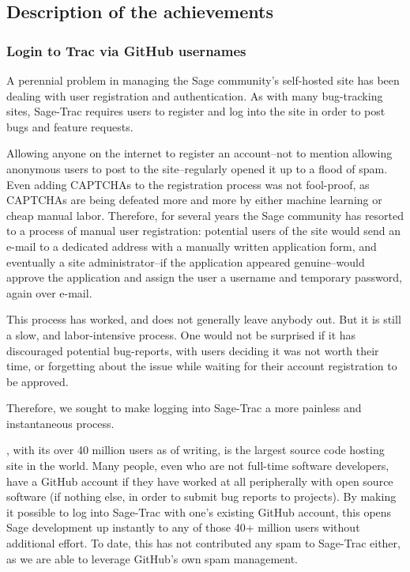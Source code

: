 \hypertarget{description-of-the-achievements}{%
\subsection{Description of the
achievements}\label{description-of-the-achievements}}

\hypertarget{trac-github-login}{%
\subsubsection{Login to Trac via GitHub usernames}\label{trac-github-login}}
A perennial problem in managing the Sage community's self-hosted \Trac site has
been dealing with user registration and authentication.  As with many
bug-tracking sites, Sage-Trac requires users to register and log into the site
in order to post bugs and feature requests.

Allowing anyone on the internet to register an account--not to mention allowing
anonymous users to post to the site--regularly opened it up to a flood of spam.
Even adding CAPTCHAs to the registration process was not fool-proof, as
CAPTCHAs are being defeated more and more by either machine learning or cheap
manual labor.  Therefore, for several years the Sage community has resorted
to a process of manual user registration: potential users of the site would
send an e-mail to a dedicated address with a manually written application form,
and eventually a site administrator--if the application appeared genuine--would
approve the application and assign the user a username and temporary password,
again over e-mail.

This process has worked, and does not generally leave anybody out.  But it is
still a slow, and labor-intensive process.  One would not be surprised if it
has discouraged potential bug-reports, with users deciding it was not worth
their time, or forgetting about the issue while waiting for their account
registration to be approved.

Therefore, we sought to make logging into Sage-Trac a more painless and
instantaneous process.

\GitHub, with its over 40 million users as of writing, is the largest source
code hosting site in the world.  Many people, even who are not full-time
software developers, have a GitHub account if they have worked at all
peripherally with open source software (if nothing else, in order to submit bug
reports to projects).  By making it possible to log into Sage-Trac with one's
existing GitHub account, this opens Sage development up instantly to any of
those 40+ million users without additional effort.  To date, this has not
contributed any spam to Sage-Trac either, as we are able to leverage GitHub's
own spam management.

